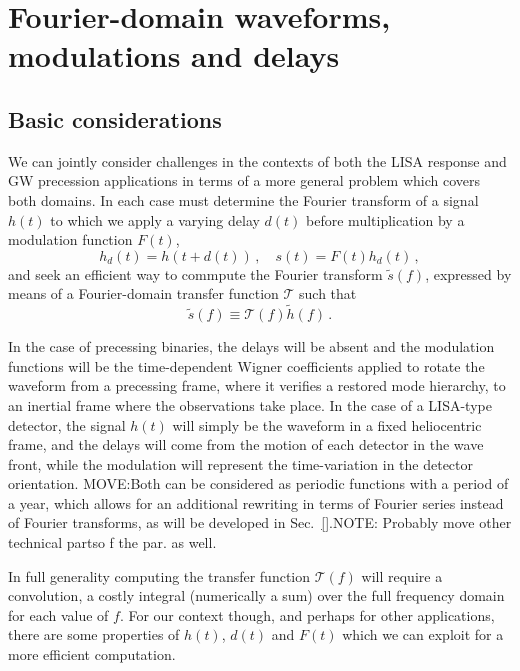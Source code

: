 \documentclass[aps,showpacs,twocolumn,
prd,superscriptaddress,nofootinbib]{revtex4-1}
\newcommand{\be}{\begin{equation}}
\newcommand{\ee}{\end{equation}}
\newcommand\calT{{\mathcal{T}}}
\newcommand{\jgb}[1]{{\color{DarkGreen} #1}}
\begin{document}

\section{Fourier-domain waveforms, modulations and delays}
\label{sec:motivation}


\subsection{Basic considerations}
\label{subsec:basic}

We can jointly consider challenges in the contexts of both the LISA response and GW precession applications in terms of a more general problem which covers both domains. In each case must determine the Fourier transform of a signal $h(t)$ to which we apply a varying delay $d(t)$ before multiplication by a modulation function $F(t)$,
\be
\label{eq:delay-mod-defs}
	h_{d}(t) = h(t+d(t)) \,, \quad s(t) = F(t)h_{d}(t) \,,
\ee
and seek an efficient way to commpute the Fourier transform $\tilde{s}(f)$, expressed by means of a Fourier-domain transfer function $\calT$ such that
\be\label{eq:deftransfer}
	\tilde{s}(f) \equiv \calT(f) \tilde{h}(f) \,. 
\ee

In the case of precessing binaries, the delays will be absent and the modulation functions will be the time-dependent Wigner coefficients applied to rotate the waveform from a precessing frame, where it verifies a restored mode hierarchy, to an inertial frame where the observations take place. In the case of a LISA-type detector, the signal $h(t)$ will simply be the waveform in a fixed heliocentric frame, and the delays will come from the motion of each detector in the wave front, while the modulation will represent the time-variation in the detector orientation. \jgb{MOVE:Both can be considered as periodic functions with a period of a year, which allows for an additional rewriting in terms of Fourier series instead of Fourier transforms, as will be developed in Sec.~\ref{}.NOTE: Probably move other technical partso f the par. as well.} 

\jgb{In full generality computing the transfer function $\calT(f)$ will require a convolution, a costly integral (numerically a sum) over the full frequency domain for each value of $f$. For our context though, and perhaps for other applications, there are some properties of $h(t)$, $d(t)$ and $F(t)$ which we can exploit for a more efficient computation.}
\end{document}
